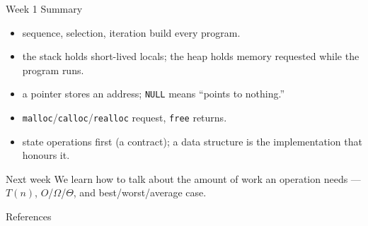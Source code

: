 \documentclass[aspectratio=169]{beamer}
\begin{document}
\begin{frame}{Week 1 Summary}
  \begin{itemize}
    \item {} sequence, selection, iteration build every program.
    \item {} the stack holds short-lived locals; the heap holds
      memory requested while the program runs.
    \item {} a pointer stores an address; \texttt{NULL} means
      ``points to nothing.''
    \item {} \texttt{malloc}/\texttt{calloc}/\texttt{realloc}
      request, \texttt{free} returns.
    \item {} state operations first (a contract); a data structure
      is the implementation that honours it.
  \end{itemize}
  \begin{exampleblock}{Next week}
    We learn how to talk about the amount of work an operation needs ---
    $T(n)$, $O$/$\Omega$/$\Theta$, and best/worst/average case.
  \end{exampleblock}
\end{frame}

\begin{frame}[allowframebreaks]{References}
  \footnotesize
  
  
\end{frame}
\end{document}
